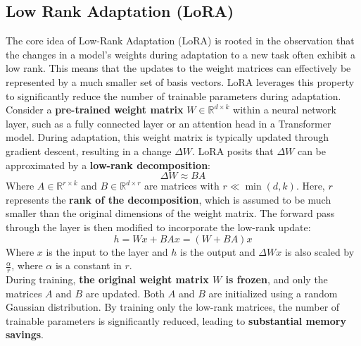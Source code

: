 \documentclass{article}
\begin{document}
	\subsection{Low Rank Adaptation (LoRA)}
	The core idea of Low-Rank Adaptation (LoRA) \cite{hu2021loralowrankadaptationlarge} is rooted in the observation that the changes in a model's weights during adaptation to a new task often exhibit a low rank.
	This means that the updates to the weight matrices can effectively be represented by a much smaller set of basis vectors. LoRA leverages this property to significantly reduce the number of trainable parameters during adaptation. \\
	Consider a \textbf{pre-trained weight matrix} $W \in \mathbb{R}^{d \times k}$ within a neural network layer, such as a fully connected layer or an attention head in a Transformer model. During adaptation, this weight matrix is typically updated through gradient descent, resulting in a change $\Delta W$. LoRA posits that $\Delta W$ can be approximated by a \textbf{low-rank decomposition}:
	\begin{equation}
		\Delta W \approx B A
	\end{equation}
	Where $A \in \mathbb{R}^{r \times k}$ and $B \in \mathbb{R}^{d \times r}$ are matrices with $r \ll \min(d, k)$. Here, $r$ represents the \textbf{rank of the decomposition}, which is assumed to be much smaller than the original dimensions of the weight matrix.
	The forward pass through the layer is then modified to incorporate the low-rank update:
	\begin{equation}
	h = W x + B A x = (W + B A) x
	\end{equation}
	Where $x$ is the input to the layer and $h$ is the output and $\Delta W x$ is also scaled by $\frac{\alpha}{r}$, where $\alpha$ is a constant in $r$. \\
	During training, \textbf{the original weight matrix $W$ is frozen}, and only the matrices $A$ and $B$ are updated. Both $A$ and $B$ are initialized using a random Gaussian distribution.
	By training only the low-rank matrices, the number of trainable parameters is significantly reduced, leading to \textbf{substantial memory savings}.
	
\end{document}
